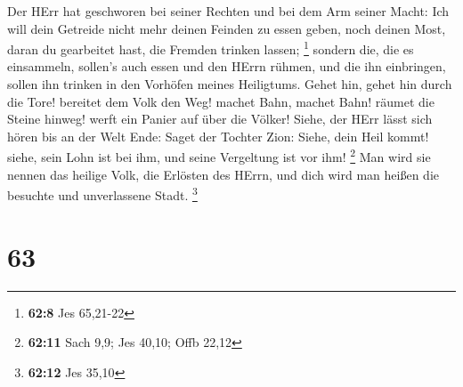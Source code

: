 Der HErr hat geschworen bei seiner Rechten und bei dem Arm seiner Macht:
Ich will dein Getreide nicht mehr deinen Feinden zu essen geben, noch
deinen Most, daran du gearbeitet hast, die Fremden trinken lassen;
\footnote{\textbf{62:8} Jes 65,21-22}  sondern die, die es
einsammeln, sollen's auch essen und den HErrn rühmen, und die ihn
einbringen, sollen ihn trinken in den Vorhöfen meines Heiligtums.
 Gehet hin, gehet hin durch die Tore! bereitet dem Volk den
Weg! machet Bahn, machet Bahn! räumet die Steine hinweg! werft ein
Panier auf über die Völker!  Siehe, der HErr lässt sich
hören bis an der Welt Ende: Saget der Tochter Zion: Siehe, dein Heil
kommt! siehe, sein Lohn ist bei ihm, und seine Vergeltung ist vor ihm!
\footnote{\textbf{62:11} Sach 9,9; Jes 40,10; Offb 22,12} 
Man wird sie nennen das heilige Volk, die Erlösten des HErrn, und dich
wird man heißen die besuchte und unverlassene Stadt. \footnote{\textbf{62:12}
  Jes 35,10}

\hypertarget{section-24}{%
\section{63}\label{section-24}}

